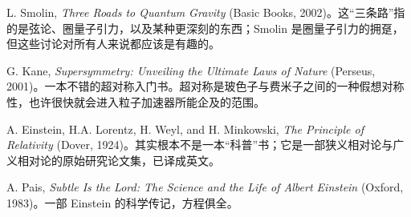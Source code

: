 L. Smolin, \emph{Three Roads to Quantum Gravity} (Basic Books, 2002)。这“三条路”指的是弦论、圈量子引力，以及某种更深刻的东西；Smolin 是圈量子引力的拥趸，但这些讨论对所有人来说都应该是有趣的。

G. Kane, \emph{Supersymmetry: Unveiling the Ultimate Laws of Nature} (Perseus, 2001)。一本不错的超对称入门书。超对称是玻色子与费米子之间的一种假想对称性，也许很快就会进入粒子加速器所能企及的范围。

A. Einstein, H.A. Lorentz, H. Weyl, and H. Minkowski, \emph{The Principle of Relativity} (Dover, 1924)。其实根本不是一本“科普”书；它是一部狭义相对论与广义相对论的原始研究论文集，已译成英文。

A. Pais, \emph{Subtle Is the Lord: The Science and the Life of Albert Einstein} (Oxford, 1983)。一部 Einstein 的科学传记，方程俱全。
